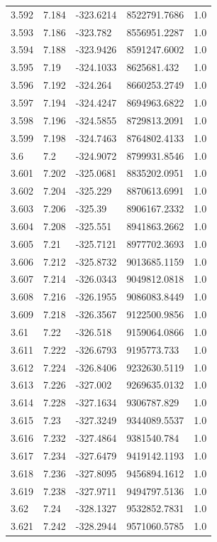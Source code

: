 \begin{tabular}{lllll}
3.592 & 7.184 & -323.6214 & 8522791.7686 & 1.0 \\
3.593 & 7.186 & -323.782 & 8556951.2287 & 1.0 \\
3.594 & 7.188 & -323.9426 & 8591247.6002 & 1.0 \\
3.595 & 7.19 & -324.1033 & 8625681.432 & 1.0 \\
3.596 & 7.192 & -324.264 & 8660253.2749 & 1.0 \\
3.597 & 7.194 & -324.4247 & 8694963.6822 & 1.0 \\
3.598 & 7.196 & -324.5855 & 8729813.2091 & 1.0 \\
3.599 & 7.198 & -324.7463 & 8764802.4133 & 1.0 \\
3.6 & 7.2 & -324.9072 & 8799931.8546 & 1.0 \\
3.601 & 7.202 & -325.0681 & 8835202.0951 & 1.0 \\
3.602 & 7.204 & -325.229 & 8870613.6991 & 1.0 \\
3.603 & 7.206 & -325.39 & 8906167.2332 & 1.0 \\
3.604 & 7.208 & -325.551 & 8941863.2662 & 1.0 \\
3.605 & 7.21 & -325.7121 & 8977702.3693 & 1.0 \\
3.606 & 7.212 & -325.8732 & 9013685.1159 & 1.0 \\
3.607 & 7.214 & -326.0343 & 9049812.0818 & 1.0 \\
3.608 & 7.216 & -326.1955 & 9086083.8449 & 1.0 \\
3.609 & 7.218 & -326.3567 & 9122500.9856 & 1.0 \\
3.61 & 7.22 & -326.518 & 9159064.0866 & 1.0 \\
3.611 & 7.222 & -326.6793 & 9195773.733 & 1.0 \\
3.612 & 7.224 & -326.8406 & 9232630.5119 & 1.0 \\
3.613 & 7.226 & -327.002 & 9269635.0132 & 1.0 \\
3.614 & 7.228 & -327.1634 & 9306787.829 & 1.0 \\
3.615 & 7.23 & -327.3249 & 9344089.5537 & 1.0 \\
3.616 & 7.232 & -327.4864 & 9381540.784 & 1.0 \\
3.617 & 7.234 & -327.6479 & 9419142.1193 & 1.0 \\
3.618 & 7.236 & -327.8095 & 9456894.1612 & 1.0 \\
3.619 & 7.238 & -327.9711 & 9494797.5136 & 1.0 \\
3.62 & 7.24 & -328.1327 & 9532852.7831 & 1.0 \\
3.621 & 7.242 & -328.2944 & 9571060.5785 & 1.0 \\

\end{tabular}
